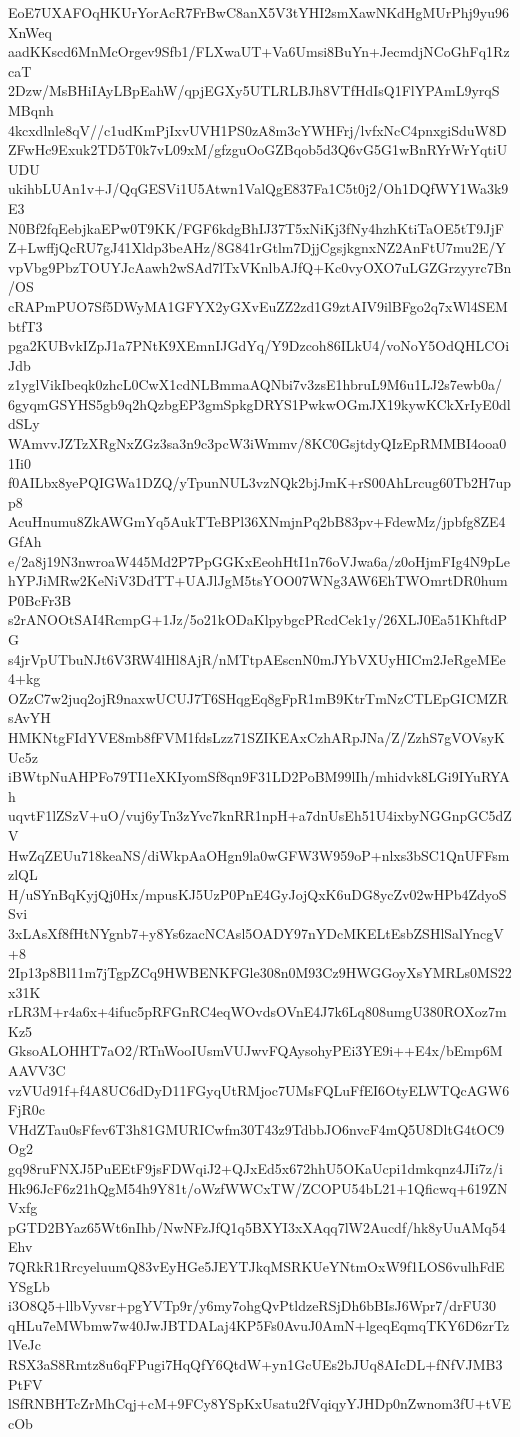 EoE7UXAFOqHKUrYorAcR7FrBwC8anX5V3tYHI2smXawNKdHgMUrPhj9yu96XnWeq
aadKKscd6MnMcOrgev9Sfb1/FLXwaUT+Va6Umsi8BuYn+JecmdjNCoGhFq1RzcaT
2Dzw/MsBHiIAyLBpEahW/qpjEGXy5UTLRLBJh8VTfHdIsQ1FlYPAmL9yrqSMBqnh
4kcxdlnle8qV//c1udKmPjIxvUVH1PS0zA8m3cYWHFrj/lvfxNcC4pnxgiSduW8D
ZFwHc9Exuk2TD5T0k7vL09xM/gfzguOoGZBqob5d3Q6vG5G1wBnRYrWrYqtiUUDU
ukihbLUAn1v+J/QqGESVi1U5Atwn1ValQgE837Fa1C5t0j2/Oh1DQfWY1Wa3k9E3
N0Bf2fqEebjkaEPw0T9KK/FGF6kdgBhIJ37T5xNiKj3fNy4hzhKtiTaOE5tT9JjF
Z+LwffjQcRU7gJ41Xldp3beAHz/8G841rGtlm7DjjCgsjkgnxNZ2AnFtU7mu2E/Y
vpVbg9PbzTOUYJcAawh2wSAd7lTxVKnlbAJfQ+Kc0vyOXO7uLGZGrzyyrc7Bn/OS
cRAPmPUO7Sf5DWyMA1GFYX2yGXvEuZZ2zd1G9ztAIV9ilBFgo2q7xWl4SEMbtfT3
pga2KUBvkIZpJ1a7PNtK9XEmnIJGdYq/Y9Dzcoh86ILkU4/voNoY5OdQHLCOiJdb
z1yglVikIbeqk0zhcL0CwX1cdNLBmmaAQNbi7v3zsE1hbruL9M6u1LJ2s7ewb0a/
6gyqmGSYHS5gb9q2hQzbgEP3gmSpkgDRYS1PwkwOGmJX19kywKCkXrIyE0dldSLy
WAmvvJZTzXRgNxZGz3sa3n9c3pcW3iWmmv/8KC0GsjtdyQIzEpRMMBI4ooa01Ii0
f0AILbx8yePQIGWa1DZQ/yTpunNUL3vzNQk2bjJmK+rS00AhLrcug60Tb2H7upp8
AcuHnumu8ZkAWGmYq5AukTTeBPl36XNmjnPq2bB83pv+FdewMz/jpbfg8ZE4GfAh
e/2a8j19N3nwroaW445Md2P7PpGGKxEeohHtI1n76oVJwa6a/z0oHjmFIg4N9pLe
hYPJiMRw2KeNiV3DdTT+UAJlJgM5tsYOO07WNg3AW6EhTWOmrtDR0humP0BcFr3B
s2rANOOtSAI4RcmpG+1Jz/5o21kODaKlpybgcPRcdCek1y/26XLJ0Ea51KhftdPG
s4jrVpUTbuNJt6V3RW4lHl8AjR/nMTtpAEscnN0mJYbVXUyHICm2JeRgeMEe4+kg
OZzC7w2juq2ojR9naxwUCUJ7T6SHqgEq8gFpR1mB9KtrTmNzCTLEpGICMZRsAvYH
HMKNtgFIdYVE8mb8fFVM1fdsLzz71SZIKEAxCzhARpJNa/Z/ZzhS7gVOVsyKUc5z
iBWtpNuAHPFo79TI1eXKIyomSf8qn9F31LD2PoBM99lIh/mhidvk8LGi9IYuRYAh
uqvtF1lZSzV+uO/vuj6yTn3zYvc7knRR1npH+a7dnUsEh51U4ixbyNGGnpGC5dZV
HwZqZEUu718keaNS/diWkpAaOHgn9la0wGFW3W959oP+nlxs3bSC1QnUFFsmzlQL
H/uSYnBqKyjQj0Hx/mpusKJ5UzP0PnE4GyJojQxK6uDG8ycZv02wHPb4ZdyoSSvi
3xLAsXf8fHtNYgnb7+y8Ys6zacNCAsl5OADY97nYDcMKELtEsbZSHlSalYncgV+8
2Ip13p8Bl11m7jTgpZCq9HWBENKFGle308n0M93Cz9HWGGoyXsYMRLs0MS22x31K
rLR3M+r4a6x+4ifuc5pRFGnRC4eqWOvdsOVnE4J7k6Lq808umgU380ROXoz7mKz5
GksoALOHHT7aO2/RTnWooIUsmVUJwvFQAysohyPEi3YE9i++E4x/bEmp6MAAVV3C
vzVUd91f+f4A8UC6dDyD11FGyqUtRMjoc7UMsFQLuFfEI6OtyELWTQcAGW6FjR0c
VHdZTau0sFfev6T3h81GMURICwfm30T43z9TdbbJO6nvcF4mQ5U8DltG4tOC9Og2
gq98ruFNXJ5PuEEtF9jsFDWqiJ2+QJxEd5x672hhU5OKaUcpi1dmkqnz4JIi7z/i
Hk96JcF6z21hQgM54h9Y81t/oWzfWWCxTW/ZCOPU54bL21+1Qficwq+619ZNVxfg
pGTD2BYaz65Wt6nIhb/NwNFzJfQ1q5BXYI3xXAqq7lW2Aucdf/hk8yUuAMq54Ehv
7QRkR1RrcyeluumQ83vEyHGe5JEYTJkqMSRKUeYNtmOxW9f1LOS6vulhFdEYSgLb
i3O8Q5+llbVyvsr+pgYVTp9r/y6my7ohgQvPtldzeRSjDh6bBIsJ6Wpr7/drFU30
qHLu7eMWbmw7w40JwJBTDALaj4KP5Fs0AvuJ0AmN+lgeqEqmqTKY6D6zrTzlVeJc
RSX3aS8Rmtz8u6qFPugi7HqQfY6QtdW+yn1GcUEs2bJUq8AIcDL+fNfVJMB3PtFV
lSfRNBHTcZrMhCqj+cM+9FCy8YSpKxUsatu2fVqiqyYJHDp0nZwnom3fU+tVEcOb

